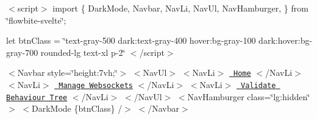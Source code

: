 $<$script$>$ import \{ Dark\+Mode, Navbar, Nav\+Li, Nav\+Ul, Nav\+Hamburger, \} from \char`\"{}flowbite-\/svelte\char`\"{};

let btn\+Class = \char`\"{}text-\/gray-\/500 dark\+:text-\/gray-\/400 hover\+:bg-\/gray-\/100 dark\+:hover\+:bg-\/gray-\/700 rounded-\/lg text-\/xl p-\/2\char`\"{} $<$/script$>$

$<$\+Navbar style=\char`\"{}height\+:7vh;\char`\"{}$>$ $<$\+Nav\+Ul$>$ $<$\+Nav\+Li$>$ \href{\#/}{\texttt{ Home}} $<$/\+Nav\+Li$>$ $<$\+Nav\+Li$>$ \href{\#/websocket}{\texttt{ Manage Websockets}} $<$/\+Nav\+Li$>$ $<$\+Nav\+Li$>$ \href{\#/validate}{\texttt{ Validate Behaviour Tree}} $<$/\+Nav\+Li$>$ $<$/\+Nav\+Ul$>$ $<$\+Nav\+Hamburger class=\char`\"{}lg\+:hidden\char`\"{} $>$ \texorpdfstring{$<$}{<}Dark\+Mode \{btn\+Class\} /\texorpdfstring{$>$}{>} $<$/\+Navbar$>$ 